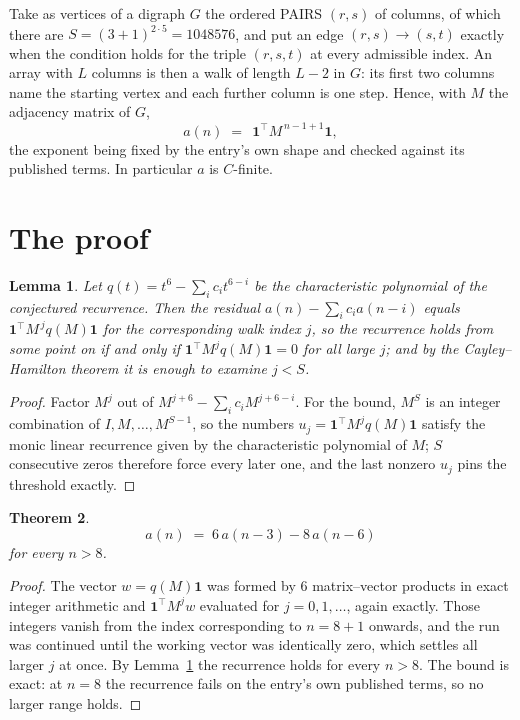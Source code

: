 \documentclass[11pt,a4paper]{article}
\theoremstyle{plain}
\newtheorem{theorem}{Theorem}
\newtheorem{lemma}[theorem]{Lemma}
\theoremstyle{definition}
\begin{document}
Take as vertices of a digraph $G$ the ordered PAIRS $(r,s)$ of columns, of which there are
$S=(3+1)^{2\cdot5}=1048576$, and put an edge $(r,s)\to(s,t)$ exactly when the condition
holds for the triple $(r,s,t)$ at every admissible index. An array with $L$ columns is then a
walk of length $L-2$ in $G$: its first two columns name the starting vertex and each further
column is one step. Hence, with $M$ the adjacency matrix of $G$,
\[
a(n)\;=\;\,\mathbf{1}^{\!\top}M^{\,n-1+1}\mathbf{1},
\]
the exponent being fixed by the entry's own shape and checked against its published terms.
In particular $a$ is $C$-finite.

\section{The proof}

\begin{lemma}\label{lem:crit}
Let $q(t)=t^{6}-\sum_i c_it^{6-i}$ be the characteristic polynomial of the
conjectured recurrence. Then the residual $a(n)-\sum_ic_ia(n-i)$ equals
$\mathbf{1}^{\!\top}M^{\,j}q(M)\mathbf{1}$ for the corresponding walk index
$j$, so the recurrence holds from some point on if and only if
$\mathbf{1}^{\!\top}M^{j}q(M)\mathbf{1}=0$ for all large $j$; and by the
Cayley--Hamilton theorem it is enough to examine $j<S$.
\end{lemma}

\begin{proof}
Factor $M^{j}$ out of $M^{j+6}-\sum_ic_iM^{j+6-i}$. For the bound, $M^{S}$
is an integer combination of $I,M,\dots,M^{S-1}$, so the numbers
$u_j=\mathbf{1}^{\!\top}M^{j}q(M)\mathbf{1}$ satisfy the monic linear recurrence given by
the characteristic polynomial of $M$; $S$ consecutive zeros therefore force every later one,
and the last nonzero $u_j$ pins the threshold exactly.
\end{proof}

\begin{theorem}
\[
a(n)\;=\;6\,a(n-3) - 8\,a(n-6)
\]
for every $n>8$.
\end{theorem}

\begin{proof}
The vector $w=q(M)\mathbf{1}$ was formed by $6$ matrix--vector products in exact
integer arithmetic and $\mathbf{1}^{\!\top}M^{j}w$ evaluated for $j=0,1,\dots$, again
exactly. Those integers vanish from the index corresponding to $n=8+1$ onwards, and the
run was continued until the working vector was identically zero, which settles all larger $j$
at once. By Lemma~\ref{lem:crit} the recurrence holds for every $n>8$. The bound is exact: at $n=8$ the recurrence fails on the entry's own published terms, so no larger range holds.
\end{proof}
\end{document}
